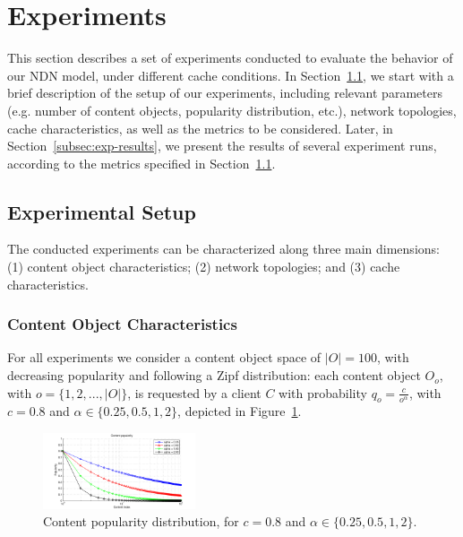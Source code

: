 \section{Experiments}
\label{sec:experiments}

This section describes a set of experiments conducted to evaluate 
the behavior of our NDN model, under different cache conditions. In 
Section~\ref{subsec:exp-setup}, we start 
with a brief description of the setup of our experiments, 
including relevant parameters (e.g. number of content objects, popularity 
distribution, etc.), network topologies, cache characteristics, as well as the 
metrics to be considered. Later, in Section~\ref{subsec:exp-results}, we 
present the results of several experiment runs, according to the metrics 
specified in Section~\ref{subsec:exp-setup}.

\subsection{Experimental Setup}
\label{subsec:exp-setup}

The conducted experiments can be characterized along three main dimensions: (1) 
content object characteristics; (2) network topologies; and (3) cache 
characteristics.\shortvertbreak

\subsubsection{Content Object Characteristics}
\label{subsec:exp-setup-cobj}

For all experiments we consider a content object space of 
$|O| = 100$, with decreasing popularity and following a Zipf distribution: 
each content object $O_o$, with $o = \{1,2,...,|O|\}$, is requested by a client 
$C$ with probability $q_{o} = \frac{c}{o^{\alpha}}$, with $c = 0.8$ and 
$\alpha \in \{0.25, 0.5, 1, 2\}$, depicted in Figure~\ref{fig:zipf}.\shortvertbreak

\begin{figure}[h!]

    \centering
    \includegraphics[width=0.40\textwidth]{figures/pop.pdf}
    \cprotect\caption{Content popularity distribution, for $c = 0.8$ and 
        $\alpha \in \{0.25, 0.5, 1, 2\}$.}
    \label{fig:zipf}

\end{figure}


